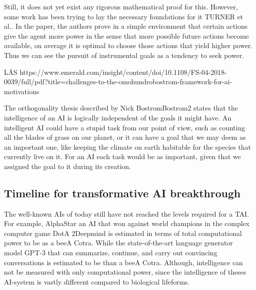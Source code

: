 \documentclass[12pt,A4]{report}
\newcommand{\autobaj}{}
\theoremstyle{definition}
\begin{document}
Still, it does not yet exist any rigorous mathematical proof for this. However, some work has been trying to lay the necessary foundations for it \autobaj{TURNER et al.}. In the paper, the authors prove in a simple environment that certain actions give the agent more power in the sense that more possible future actions become available, on average it is optimal to choose those actions that yield higher power. Thus we can see the pursuit of instrumental goals as a tendency to seek power.

LÄS
https://www.emerald.com/insight/content/doi/10.1108/FS-04-2018-0039/full/pdf?title=challenges-to-the-omohundrobostrom-framework-for-ai-motivations

The orthogonality thesis described by Nick Bostrom\autobaj{Bostrom2} states that the intelligence of an AI is logically independent of the goals it might have. An intelligent AI could have a stupid task from our point of view, such as counting all the blades of grass on our planet, or it can have a goal that we may deem as an important one, like keeping the climate on earth habitable for the species that currently live on it. For an AI each task would be as important, given that we assigned the goal to it during its creation.



\subsection{Timeline for transformative AI breakthrough}
The well-known AIs of today still have not reached the levels required for a TAI. For example, AlphaStar an AI that won against world champions in the complex computer game DotA 2\autobaj{Deepmind} is estimated in terms of total computational power to be  as a bee\autobaj{A Cotra}. While the state-of-the-art language generator model GPT-3 that can summarize, continue, and carry out convincing conversations is estimated to be  than a bee\autobaj{A Cotra}. Although, intelligence can not be measured with only computational power, since the intelligence of theses AI-system is vastly different compared to biological lifeforms. 
\end{document}
